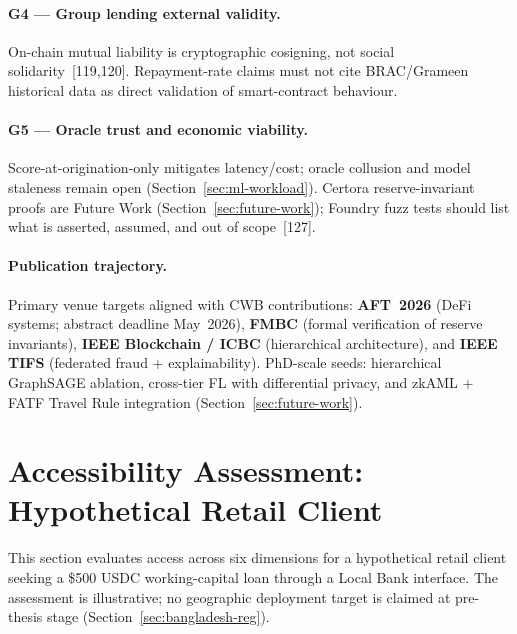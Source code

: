 \documentclass[12pt,a4paper]{report}
\begin{document}
\paragraph{G4 --- Group lending external validity.}
On-chain mutual liability is cryptographic cosigning, not social solidarity~[119,120]. Repayment-rate claims must not cite BRAC/Grameen historical data as direct validation of smart-contract behaviour.

\paragraph{G5 --- Oracle trust and economic viability.}
Score-at-origination-only mitigates latency/cost; oracle collusion and model staleness remain open (Section~\ref{sec:ml-workload}). Certora reserve-invariant proofs are Future Work (Section~\ref{sec:future-work}); Foundry fuzz tests should list what is asserted, assumed, and out of scope~[127].

\paragraph{Publication trajectory.}
Primary venue targets aligned with CWB contributions: \textbf{AFT~2026} (DeFi systems; abstract deadline May~2026), \textbf{FMBC} (formal verification of reserve invariants), \textbf{IEEE Blockchain / ICBC} (hierarchical architecture), and \textbf{IEEE TIFS} (federated fraud + explainability). PhD-scale seeds: hierarchical GraphSAGE ablation, cross-tier FL with differential privacy, and zkAML + FATF Travel Rule integration (Section~\ref{sec:future-work}).

\section{Accessibility Assessment: Hypothetical Retail Client}

This section evaluates access across six dimensions for a hypothetical retail client seeking a \$500 USDC working-capital loan through a Local Bank interface. The assessment is illustrative; no geographic deployment target is claimed at pre-thesis stage (Section~\ref{sec:bangladesh-reg}).
\end{document}
